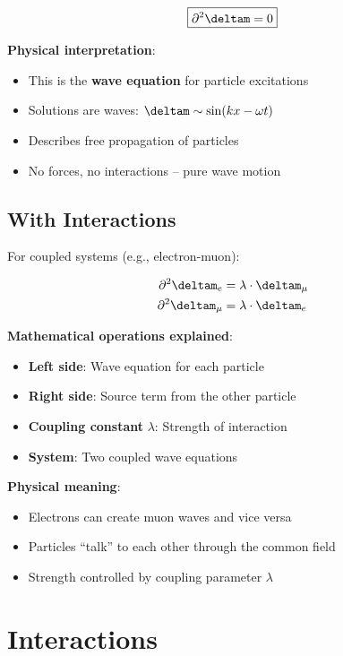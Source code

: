 	\begin{equation}
		\boxed{\partial^2 \deltam = 0}
		\label{eq:field_equation}
	\end{equation}
	
	\textbf{Physical interpretation}: 
	\begin{itemize}
		\item This is the \textbf{wave equation} for particle excitations
		\item Solutions are waves: $\deltam \sim \sin(kx - \omega t)$
		\item Describes free propagation of particles
		\item No forces, no interactions -- pure wave motion
	\end{itemize}
	
	\subsection{With Interactions}
	
	For coupled systems (e.g., electron-muon):
	
	\begin{align}
		\partial^2 \deltam_e &= \lambda \cdot \deltam_{\mu} \\
		\partial^2 \deltam_{\mu} &= \lambda \cdot \deltam_e
	\end{align}
	
	\textbf{Mathematical operations explained}:
	\begin{itemize}
		\item \textbf{Left side}: Wave equation for each particle
		\item \textbf{Right side}: Source term from the other particle
		\item \textbf{Coupling constant} $\lambda$: Strength of interaction
		\item \textbf{System}: Two coupled wave equations
	\end{itemize}
	
	\textbf{Physical meaning}:
	\begin{itemize}
		\item Electrons can create muon waves and vice versa
		\item Particles ``talk'' to each other through the common field
		\item Strength controlled by coupling parameter $\lambda$
	\end{itemize}

	\section{Interactions}
	
